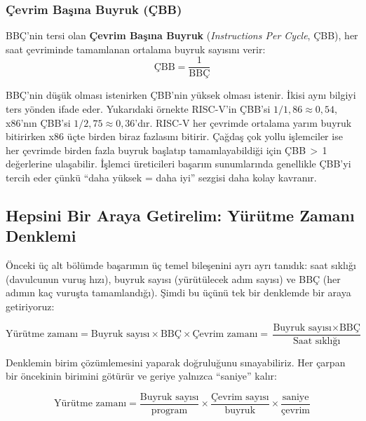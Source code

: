 \subsubsection*{Çevrim Başına Buyruk (ÇBB)}

BBÇ'nin tersi olan \textbf{Çevrim Başına Buyruk} (\emph{Instructions Per Cycle}, ÇBB), her saat çevriminde tamamlanan ortalama buyruk sayısını verir:
\begin{equation}
\text{ÇBB} = \frac{1}{\text{BBÇ}}
\label{eq:cbb}
\end{equation}

\noindent BBÇ'nin düşük olması istenirken ÇBB'nin yüksek olması istenir. İkisi aynı bilgiyi ters yönden ifade eder. Yukarıdaki örnekte RISC-V'in ÇBB'si $1/1{,}86 \approx 0{,}54$, x86'nın ÇBB'si $1/2{,}75 \approx 0{,}36$'dır. RISC-V her çevrimde ortalama yarım buyruk bitirirken x86 üçte birden biraz fazlasını bitirir. Çağdaş çok yollu işlemciler ise her çevrimde birden fazla buyruk başlatıp tamamlayabildiği için ÇBB\,$>$\,1 değerlerine ulaşabilir. İşlemci üreticileri başarım sunumlarında genellikle ÇBB'yi tercih eder çünkü ``daha yüksek = daha iyi'' sezgisi daha kolay kavranır.

\subsection{Hepsini Bir Araya Getirelim: Yürütme Zamanı Denklemi}
\label{subsec:yurutme-zamani-denklemi}

Önceki üç alt bölümde başarımın üç temel bileşenini ayrı ayrı tanıdık: saat sıklığı (davulcunun vuruş hızı), buyruk sayısı (yürütülecek adım sayısı) ve BBÇ (her adımın kaç vuruşta tamamlandığı). Şimdi bu üçünü tek bir denklemde bir araya getiriyoruz:

\begin{equation}
\text{Yürütme zamanı} = \text{Buyruk sayısı} \times \text{BBÇ} \times \text{Çevrim zamanı} = \frac{\text{Buyruk sayısı} \times \text{BBÇ}}{\text{Saat sıklığı}}
\label{eq:yurutme-zamani-bbc}
\end{equation}

Denklemin birim çözümlemesini yaparak doğruluğunu sınayabiliriz. Her çarpan bir öncekinin birimini götürür ve geriye yalnızca ``saniye'' kalır:

\begin{equation}
\text{Yürütme zamanı} = \frac{\text{Buyruk sayısı}}{\text{program}} \times \frac{\text{Çevrim sayısı}}{\text{buyruk}} \times \frac{\text{saniye}}{\text{çevrim}}
\label{eq:yurutme-birim}
\end{equation}

